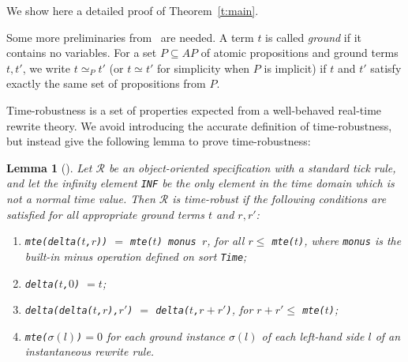 \documentclass[journal]{IEEEtranTIE}
\newtheorem{lemma}[theorem]{Lemma}
\begin{document}
\label{a:proof}
\setcounter{theorem}{0}
\renewcommand{\thetheorem}{\thesection.\arabic{theorem}}
\newcommand{\lrps}[2]{\rightarrow^{#1}_{#2}}

We show here a detailed proof of Theorem~\ref{t:main}.

Some more preliminaries from~\cite{DBLP:journals/entcs/OlveczkyM07a}
are needed. A term $t$ is called \emph{ground} if it contains no
variables. For a set $P\subseteq AP$ of atomic propositions and ground
terms $t,t'$, we write $t\simeq_P t'$ (or $t\simeq t'$ for simplicity
when $P$ is implicit) if $t$ and $t'$ satisfy exactly the same set of
propositions from $P$.

Time-robustness is a set of properties expected from a well-behaved
real-time rewrite theory. We avoid introducing the accurate definition
of time-robustness, but instead give the following lemma to prove
time-robustness:
\begin{lemma}[\cite{DBLP:journals/entcs/OlveczkyM07a}]
\label{l:timerobustness}
Let $\mathcal{R}$ be an object-oriented specification with a standard
tick rule, and let the infinity element \verb|INF| be the only element
in the time domain which is not a normal time value.  Then
$\mathcal{R}$ is time-robust if the following conditions are satisfied
for all appropriate ground terms $t$ and $r,r'$:
\begin{enumerate}
\item
[(i)] \verb|mte(delta(|$t$\verb|,|$r$\verb|))| $=$
\verb|mte(|$t$\verb|) monus |$r$, for all $r\le$
\verb|mte(|$t$\verb|)|, where \verb|monus| is the built-in minus
operation defined on sort \verb|Time|;

\item
[(ii)] \verb|delta(|$t$\verb|,|$0$\verb|)| $= t$;

\item
[(iii)] \verb|delta(delta(|$t$\verb|,|$r$\verb|),|$r'$\verb|)| $=$
\verb|delta(|$t$\verb|,|$r+r'$\verb|)|, for $r+r'\le$
\verb|mte(|$t$\verb|)|;

\item
[(iv)] \verb|mte(|$\sigma(l)$\verb|)|$= 0$ for each ground instance
$\sigma(l)$ of each left-hand side $l$ of an instantaneous rewrite
rule.
\end{enumerate}
\end{lemma}
\end{document}

